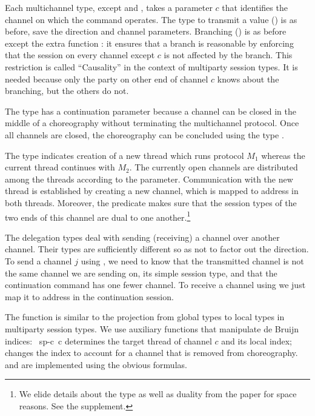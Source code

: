 \documentclass[acmsmall,review,anonymous,screen]{acmart}
\begin{document}
Each multichannel type, except {\ACconnect} and {\ACterminate}, takes a parameter
$c$ that identifies the channel on which the command operates. 
The type to transmit a value (\ACtransmit) is as before, save the
direction and channel parameters. Branching (\ACbranch) is as before
except the extra function {\ACausality}: it ensures that a branch is
reasonable by enforcing that the session on every channel except $c$
is not affected by the branch. This restriction is called
``Causality'' in the context of multiparty session types. It is needed
because only the party on other end of channel $c$ knows about the
branching, but the others do not.

The {\ACclose} type has a continuation parameter because a channel
can be closed in the middle of a choreography without terminating the
multichannel protocol. Once all channels are closed, the choreography
can be concluded using the type {\ACterminate}.

The type {\ACconnect} indicates creation of a new thread which runs protocol $M_1$
whereas the current thread continues with $M_2$. The currently open
channels are distributed among the threads according to the {\ASplit}
parameter.
Communication with the new thread is established by 
creating a new channel, which is mapped to address {\Azero} in both
threads. Moreover, the {\ACheckDual} predicate makes sure that the
session types of the two ends of this channel are dual to one
another.\footnote{We elide details about the {\ASplit} type as well as
  duality from the paper for space reasons. See the supplement.}

The delegation types deal with sending (receiving) a channel over
another channel. Their types are sufficiently different so as not to
factor out the direction. To send a channel $j$ using {\ACdelegateOUT}, we need to know that
the transmitted channel is not the same channel we are sending on, its simple session type,
and that the continuation command has one fewer channel.
To receive a channel using {\ACdelegateIN} we just map it to address
{\Azero} in the continuation session.

The function {\Aproject} is similar to the projection from global
types to local types in multiparty session types. We use
auxiliary functions that manipulate de Bruijn indices:
{\AlocateSplit~sp-c~c} determines the target thread of channel $c$ and
its local index; {\Aadjust} changes the index to account for a channel
that is removed from choreography. {\ACausality} and {\ACheckDual} are
implemented using the obvious formulas.
\multiProjection
\end{document}
